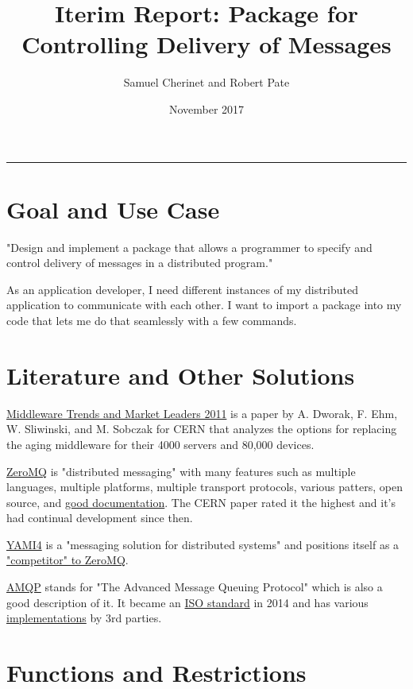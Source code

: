 \documentclass[twoside]{article}
\title{Iterim Report: Package for Controlling Delivery of Messages}
\author{Samuel Cherinet and Robert Pate }
\date{November 2017}
\newcommand{\HRule}{\rule{\linewidth}{0.4mm}}
\begin{document}
\maketitle
\HRule

\section{Goal and Use Case}

"Design and implement a package that allows a programmer to specify and control delivery of messages in a distributed program."

As an application developer, I need different instances of my distributed application to communicate with each other. I want to import a package into my code that lets me do that seamlessly with a few commands.

\section{Literature and Other Solutions}

\href{http://zeromq.wdfiles.com/local--files/intro\%3Aread-the-manual/Middleware\%20Trends\%20and\%20Market\%20Leaders\%202011.pdf}{Middleware Trends and Market Leaders 2011} is a paper by A. Dworak, F. Ehm, W. Sliwinski, and M. Sobczak for CERN that analyzes the options for replacing the aging middleware for their 4000 servers and 80,000 devices. 

\href{http://zeromq.org}{ZeroMQ} is "distributed messaging" with many features such as multiple languages, multiple platforms, multiple transport protocols, various patters, open source, and \href{http://zeromq.org/intro:read-the-manual}{good documentation}. The CERN paper rated it the highest and it's had continual development since then.

\href{http://www.inspirel.com/yami4/}{YAMI4} is a "messaging solution for distributed systems" and positions itself as a \href{http://www.inspirel.com/articles/YAMI4_vs_ZeroMQ.html}{"competitor" to ZeroMQ}.

\href{http://www.amqp.org/}{AMQP} stands for "The Advanced Message Queuing Protocol" which is also a good description of it. It became an \href{https://www.oasis-open.org/news/pr/iso-and-iec-approve-oasis-amqp-advanced-message-queuing-protocol}{ISO standard} in 2014 and has various \href{http://www.amqp.org/about/examples}{implementations} by 3rd parties. 


\section{Functions and Restrictions}
\end{document}
